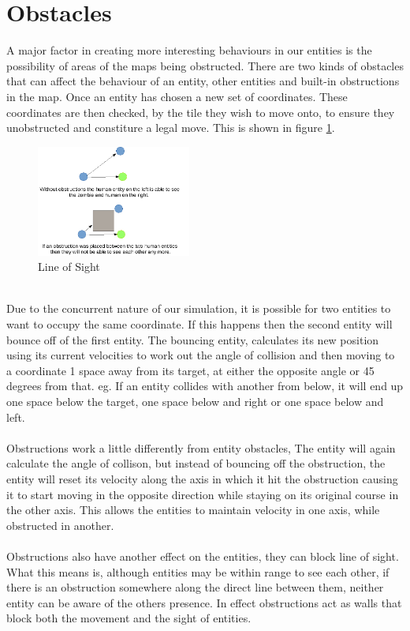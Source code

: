 \documentclass[10pt, a4paper, conference, compsocconf]{IEEEtran}
\begin{document}
\section{Obstacles \label{obstacles_b}}
A major factor in creating more interesting behaviours in our entities is the possibility of areas of the maps being obstructed. There are two kinds of obstacles that can affect the behaviour of an entity, other entities and built-in obstructions in the map. Once an entity has chosen a new set of coordinates. These coordinates are then checked, by the tile they wish to move onto, to ensure they unobstructed and constiture a legal move. This is shown in figure \ref{fig:obs_los}.\\
\begin{figure}[h]
  \centering
  \includegraphics[width=2in]{../img/los_demo.png}
\caption{Line of Sight}
    \label{fig:obs_los}
\end{figure}
\\
Due to the concurrent nature of our simulation, it is possible for two entities to want to occupy the same coordinate. If this happens then the second entity will bounce off of the first entity. The bouncing entity, calculates its new position using its current velocities to work out the angle of collision and then moving to a coordinate 1 space away from its target, at either the opposite angle or 45 degrees from that. eg. If an entity collides with another from below, it will end up one space below the target, one space below and right or one space below and left.\\
\\
Obstructions work a little differently from entity obstacles, The entity will again calculate the angle of collison, but instead of bouncing off the obstruction, the entity will reset its velocity along the axis in which it hit the obstruction causing it to start moving in the opposite direction while staying on its original course in the other axis. This allows the entities to maintain velocity in one axis, while obstructed in another.\\
\\
Obstructions also have another effect on the entities, they can block line of sight. What this means is, although entities may be within range to see each other, if there is an obstruction somewhere along the direct line between them, neither entity can be aware of the others presence. In effect obstructions act as walls that block both the movement and the sight of entities.\\
\end{document}
